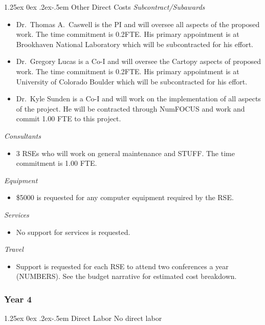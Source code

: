\documentclass[12pt]{article}
\makeatletter
\numberwithin{page}{section}
\renewcommand{\paragraph}{%
  \@startsection{paragraph}{4}%
  {\z@}{1.25ex \@plus 0ex \@minus .2ex}{-.5em}%
  {\normalfont\normalsize\itshape\bfseries}%
}
\makeatother
\begin{document}
\paragraph{Other Direct Costs}
\textit{Subcontract/Subawards}
\begin{itemize}
  \item Dr.\ Thomas A.\ Caswell is the PI and will oversee all aspects of the
  proposed work.  The time commitment is 0.2FTE.  His primary
  appointment is at Brookhaven National Laboratory which will be
  subcontracted for his effort.
\item Dr.\ Gregory Lucas is a Co-I and will oversee the Cartopy aspects of
  proposed work.  The time commitment is 0.2FTE.  His primary appointment is at
  University of Colorado Boulder which will be subcontracted for his effort.
\item Dr.\ Kyle Sunden is a Co-I and will work on the implementation of all
  aspects of the project.  He will be contracted through NumFOCUS and work and
  commit 1.00 FTE to this project.
\end{itemize}
\textit{Consultants}
\begin{itemize}
\item 3 RSEs who will work on general maintenance and STUFF.  The time commitment is 1.00
  FTE.
\end{itemize}
\textit{Equipment}
\begin{itemize}
\item \$5000 is requested for any computer equipment required by the RSE.
\end{itemize}
\textit{Services}
\begin{itemize}
\item No support for services is requested.
\end{itemize}
\textit{Travel}
\begin{itemize}
\item Support is requested for each RSE to attend two conferences a
  year (NUMBERS).  See the budget narrative for estimated cost
  breakdown.
\end{itemize}
\subsubsection{Year 4}
\paragraph{Direct Labor}
No direct labor
\end{document}
